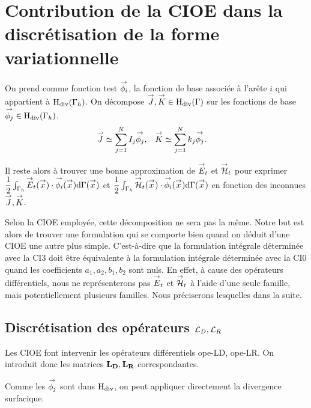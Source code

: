 
\section{Contribution de la CIOE dans la discrétisation de la forme variationnelle}

  On prend comme fonction test \({\overset{\rightarrow}{\phi_i}}\), la fonction de base associée à l'arête \(i\) qui appartient à \(\mathrm{H}_\mathrm{div}(\Gamma_h)\).
  On décompose \({\overset{\rightarrow}{J}},{\overset{\rightarrow}{K}} \in \mathrm{H}_\mathrm{div}(\Gamma)\) sur les fonctions de base \({\overset{\rightarrow}{\phi_j}} \in \mathrm{H}_\mathrm{div}(\Gamma_h)\).
    \begin{align*}
      {\overset{\rightarrow}{J}} & \simeq \sum_{j=1}^N I_j {\overset{\rightarrow}{\phi_j}},
      &
      {\overset{\rightarrow}{K}} & \simeq \sum_{j=1}^N k_j {\overset{\rightarrow}{\phi_j}}.
    \end{align*}

  Il reste alors à trouver une bonne approximation de \({\overset{\rightarrow}{E}}_t\) et \({\overset{\rightarrow}{\mathcal{H}}}_t\) pour exprimer \( \dfrac{1}{2} \int_{\Gamma_h} {\overset{\rightarrow}{E}}_t({\overset{\rightarrow}{x}}) \cdot {\overset{\rightarrow}{\phi_i}}({\overset{\rightarrow}{x}}) \mathrm{d}{\Gamma}({\overset{\rightarrow}{x}})\) et \(\dfrac{1}{2} \int_{\Gamma_h} {\overset{\rightarrow}{\mathcal{H}}}_t({\overset{\rightarrow}{x}}) \cdot {\overset{\rightarrow}{\phi_i}}({\overset{\rightarrow}{x}}) \mathrm{d}{\Gamma}({\overset{\rightarrow}{x}})\) en fonction des inconnues \({\overset{\rightarrow}{J}}, {\overset{\rightarrow}{K}}\).

  Selon la CIOE employée, cette décomposition ne sera pas la même.
  Notre but est alors de trouver une formulation qui se comporte bien quand on déduit d'une CIOE une autre plus simple.
  C'est-à-dire que la formulation intégrale déterminée avec la CI3 doit être équivalente à la formulation intégrale déterminée avec la CI0 quand les coefficients \(a_1,a_2,b_1,b_2\) sont nuls.
  En effet, à cause des opérateurs différentiels, nous ne représenterons pas \({\overset{\rightarrow}{E}}_t\) et \({\overset{\rightarrow}{\mathcal{H}}}_t\) à l'aide d'une seule famille, mais potentiellement plusieurs familles.
  Nous préciserons lesquelles dans la suite.

  \subsection[Discrétisation des opérateurs LD, LR]{Discrétisation des opérateurs \({\mathcal{L}_D},{\mathcal{L}_R}\)}
    Les CIOE font intervenir les opérateurs différentiels \gls{ope-LD}, \gls{ope-LR}.
    On introduit donc les matrices \(\mathbf{L_D},\mathbf{L_R}\) correspondantes.

    Comme les \({\overset{\rightarrow}{\phi_j}}\) sont dans \(\mathrm{H}_\mathrm{div}\), on peut appliquer directement la divergence surfacique.
    
